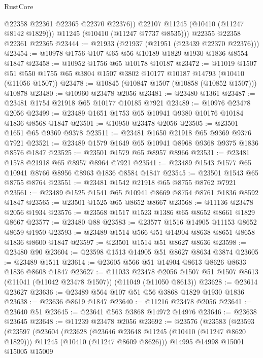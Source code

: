 \begin{lexlean}{RustCore}
\begin{coremodule}
            @22358
            @22361
            @22365
            @22370
            @22376))
        @22107
        @11245
        (@10410 (@11247 @8142 @1829)))
      @11245
      (@10410 (@11247 @7737 @8535)))
    @22355
    @22358
    @22361
    @22365
@23444 := @21933 (@21937 (@21951 (@23439 @22370 @22376)))
@23454 := @10978 @1756 @107 @65 @56 @10189 @1829 @1930 @1836 @8554 @1847
@23458 := @10952 @1756 @65 @10178 @10187
@23472 := @11019
    @1507
    @51
    @550
    @1755
    @65
    @3804
    @1507
    @3802
    @10177
    @10187
    @14793
    (@10410 (@11056 @1507))
@23478 := @10845 (@10847 @1507 (@10858 (@10852 @1507))) @10878
@23480 := @10960 @23478 @2056
@23481 := @23480 @1361
@23487 := @23481 @1754 @21918 @65 @10177 @10185 @7921
@23489 := @10976 @23478 @2056
@23499 := @23489 @1651 @1753 @65 @10941 @9380 @10176 @10184 @1836 @8568 @1847
@23501 := @10950 @23478 @2056
@23505 := @23501 @1651 @65 @9369 @9378
@23511 := @23481 @1650 @21918 @65 @9369 @9376 @7921
@23521 := @23489 @1579 @1649 @65 @10941 @8968 @9368 @9375 @1836 @8576 @1847
@23525 := @23501 @1579 @65 @8957 @8966
@23531 := @23481 @1578 @21918 @65 @8957 @8964 @7921
@23541 := @23489 @1543 @1577 @65 @10941 @8766 @8956 @8963 @1836 @8584 @1847
@23545 := @23501 @1543 @65 @8755 @8764
@23551 := @23481 @1542 @21918 @65 @8755 @8762 @7921
@23561 := @23489 @1525 @1541 @65 @10941 @8669 @8754 @8761 @1836 @8592 @1847
@23565 := @23501 @1525 @65 @8652 @8667
@23568 := @11136 @23478 @2056 @1934
@23576 := @23568 @1517 @1523 @1386 @65 @8652 @8661 @1829 @8667
@23577 := @23480 @88
@23583 := @23577 @1516 @14905 @11153 @8652 @8659 @1950
@23593 := @23489 @1514 @566 @51 @14904 @8638 @8651 @8658 @1836 @8600 @1847
@23597 := @23501 @1514 @51 @8627 @8636
@23598 := @23480 @90
@23604 := @23598 @1513 @14905 @51 @8627 @8634 @3874
@23605 := @23489 @1511
@23614 := @23605 @566 @51 @14904 @8613 @8626 @8633 @1836 @8608 @1847
@23627 := @11033
    @23478
    @2056
    @1507
    @51
    @1507
    @8613
    (@11041 (@11042 @23478 @1507))
    (@11049 (@11050 @8613))
@23628 := @23614 @23627
@23636 := @23489 @564 @107 @51 @56 @3868 @1829 @1930 @1836
@23638 := @23636 @8619 @1847
@23640 := @11216 @23478 @2056
@23641 := @23640 @51
@23645 := @23641 @563 @3868 @14972 @14976
@23646 := @23638 @23645
@23648 := @11239 @23478 @2056
@23692 := @23576
    (@23583
      (@23593
        (@23597
          (@23604
            (@23628
              (@23646 @23648 @11245 (@10410 (@11247 @8620 @1829)))
              @11245
              (@10410 (@11247 @8609 @8626)))
            @14995
            @14998
            @15001
            @15005
            @15009

\end{coremodule}
\end{lexlean}

